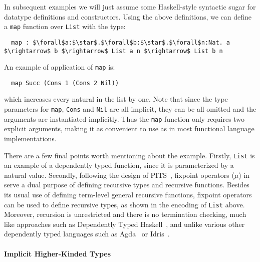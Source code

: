\noindent
In subsequent examples we will just assume some
Haskell-style syntactic sugar for datatype definitions and constructors.
Using the above definitions, we can define a \lstinline{map} function over \lstinline{List} with the type:
\begin{lstlisting}
  map : $\forall$a:$\star$.$\forall$b:$\star$.$\forall$n:Nat. a $\rightarrow$ b $\rightarrow$ List a n $\rightarrow$ List b n
\end{lstlisting}
An example of application of \lstinline{map} is:
\begin{lstlisting}
  map Succ (Cons 1 (Cons 2 Nil))
\end{lstlisting}
\noindent which increases every natural in the list by one.
Note that since the type parameters for \lstinline{map}, \lstinline{Cons} and \lstinline{Nil}
are all implicit, they can be all omitted
and the arguments are instantiated implicitly. Thus the \lstinline{map} function
only requires two explicit arguments, making it as convenient to use
as in most functional language implementations.

There are a few final points worth mentioning about the example.
Firstly, \lstinline{List} is an example of a dependently typed function, since it is parameterized
by a natural value. Secondly, following the design of PITS~\citep{yang2019pure},
fixpoint operators ($\mu$) in \name serve a dual purpose of defining recursive types and recursive
functions. Besides its usual use of defining term-level general recursive functions,
fixpoint operators can be used to define recursive types, as shown in the encoding of \lstinline{List}
above.
Moreover, recursion is unrestricted and there is no termination checking, much like approaches
such as Dependently Typed Haskell~\citep{dh}, and unlike various other dependently typed languages
such as Agda~\citep{2007_norell_agda} or Idris~\citep{brady2013idris}.

\paragraph{Implicit Higher-Kinded Types}

